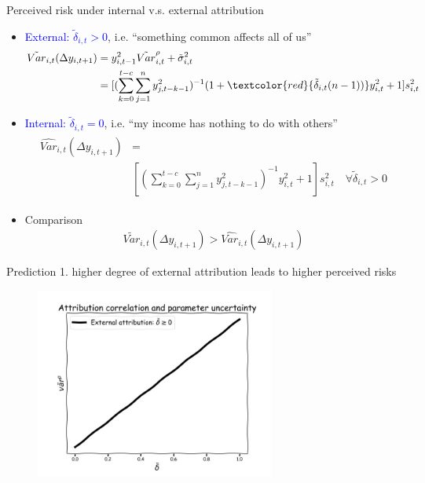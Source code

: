 \documentclass{beamer}
\begin{document}
\begin{frame}{Perceived risk under internal  v.s. external attribution}
	
	\begin{itemize}
		\item \textcolor{blue}{External: $\tilde \delta_{i,t} >0$}, i.e. ``something common affects all of us''
	\begin{eqnarray}
	\begin{split}
	\tilde {Var}_{i,t}(\Delta y_{i,t+1}) & = y_{i,t-1}^2 \tilde{Var}^{\rho}_{i,t} + \tilde{\sigma}^2_{i,t} \\
	& = [(\sum^{t-c}_{k=0}\sum^{n}_{j=1}y^2_{j,t-k-1})^{-1}(1+\textcolor{red}{ \tilde\delta_{i,t}(n-1))}y^2_{i,t} + 1] s^2_{i,t}
	\end{split}
	\end{eqnarray}
		\item \textcolor{blue}{Internal: $\tilde \delta_{i,t} =0$}, i.e. ``my income has nothing to do with others''
		\begin{eqnarray}
	\begin{split}
	\widehat{Var}_{i,t}(\Delta y_{i,t+1}) & = \\
	& [(\sum^{t-c}_{k=0}\sum^{n}_{j=1}y^2_{j,t-k-1})^{-1}y^2_{i,t} + 1] s^2_{i,t} \quad \forall \tilde \delta_{i,t} >0
		\end{split}
	\end{eqnarray}
		\item Comparison
		\begin{eqnarray}
		\tilde {Var}_{i,t}(\Delta y_{i,t+1}) > \widehat{Var}_{i,t}(\Delta y_{i,t+1})
		\end{eqnarray}
	\end{itemize}
	
\end{frame}


\begin{frame}{Prediction 1. higher degree of external attribution leads to higher perceived risks}
	\begin{figure}
		\centering 
		\label{var_experience_var}
		\includegraphics[width=0.7\textwidth]{figures/corr_var.jpg}
	\end{figure}
\end{frame}
\end{document}
